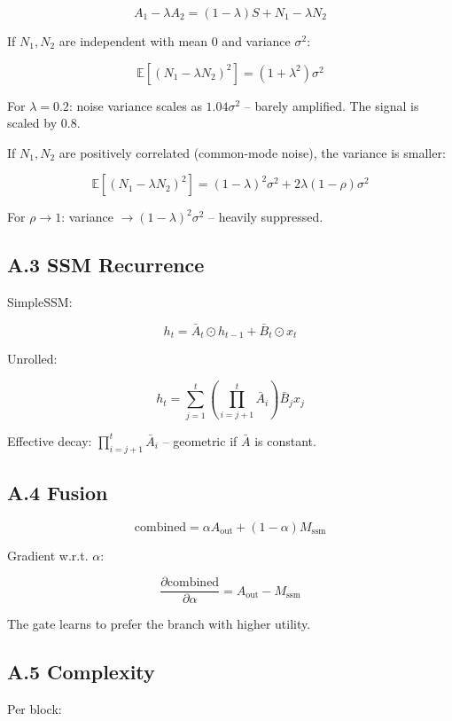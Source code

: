 \[
A_1 - \lambda A_2 = (1 - \lambda) S + N_1 - \lambda N_2
\tag{A.4}
\]

If $N_1, N_2$ are independent with mean 0 and variance $\sigma^2$:

\[
\mathbb{E}[(N_1 - \lambda N_2)^2] = (1 + \lambda^2) \sigma^2
\tag{A.5}
\]

For $\lambda = 0.2$: noise variance scales as $1.04 \sigma^2$ -- barely 
amplified. The signal is scaled by $0.8$.

If $N_1, N_2$ are positively correlated (common-mode noise), the variance 
is smaller:

\[
\mathbb{E}[(N_1 - \lambda N_2)^2] = (1 - \lambda)^2 \sigma^2 + 2\lambda(1 - \rho) \sigma^2
\tag{A.6}
\]

For $\rho \to 1$: variance $\to (1 - \lambda)^2 \sigma^2$ -- heavily 
suppressed.

\subsection{A.3 SSM Recurrence}

SimpleSSM:

\[
h_t = \bar{A}_t \odot h_{t-1} + \bar{B}_t \odot x_t
\tag{A.7}
\]

Unrolled:

\[
h_t = \sum_{j=1}^{t} \left( \prod_{i=j+1}^{t} \bar{A}_i \right) \bar{B}_j x_j
\tag{A.8}
\]

Effective decay: $\prod_{i=j+1}^t \bar{A}_i$ -- geometric if $\bar{A}$ is 
constant.

\subsection{A.4 Fusion}

\[
\text{combined} = \alpha A_\text{out} + (1 - \alpha) M_\text{ssm}
\tag{A.9}
\]

Gradient w.r.t. $\alpha$:

\[
\frac{\partial \text{combined}}{\partial \alpha} = A_\text{out} - M_\text{ssm}
\tag{A.10}
\]

The gate learns to prefer the branch with higher utility.

\subsection{A.5 Complexity}

Per block:

